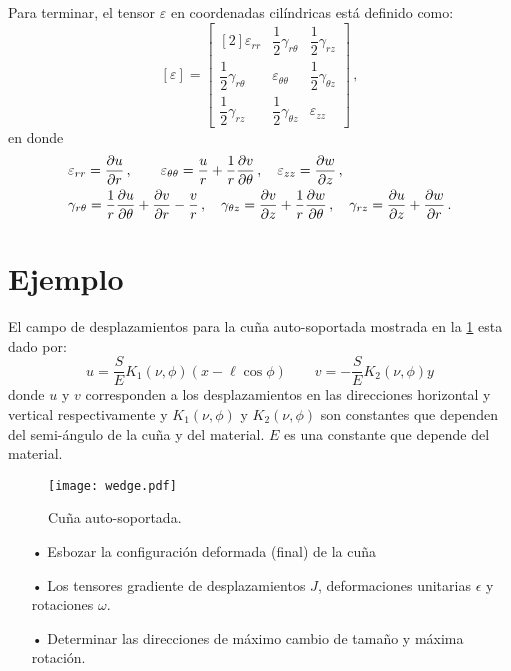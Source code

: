 \documentclass[../notas medios.tex]{subfiles}
\begin{document}
Para terminar, el tensor $\varepsilon$ en coordenadas cilíndricas está definido 
como: 
\[	
[\varepsilon] =
\begin{bmatrix}[2]
  \varepsilon_{rr} & \dfrac{1}{2} \gamma_{r\theta} & \dfrac{1}{2} \gamma_{rz}  
  \\
  \dfrac{1}{2} \gamma_{r\theta}  & \varepsilon_{\theta\theta} & 
  \dfrac{1}{2}  \gamma_{\theta z}  \\
  \dfrac{1}{2} \gamma_{rz} & \dfrac{1}{2} \gamma_{\theta z}  &  
  \varepsilon_{zz}
\end{bmatrix}\, ,\]
en donde
\begin{align*}	
    &\varepsilon_{rr} = \pdv{u}{r}\, ,\qquad
    \varepsilon_{\theta \theta} = \frac{u}{r} + \frac{1}{r}\pdv{v}{\theta}\, ,
    \quad \varepsilon_{zz} = \pdv{w}{z}\, ,\\
    &\gamma_{r \theta} = \frac{1}{r} \pdv{u}{\theta} + \pdv{v}{r} - 
    \frac{v}{r}\, ,\quad
    \gamma_{\theta z} = \pdv{v}{z} + \frac{1}{r}\pdv{w}{\theta}\, ,\quad
    \gamma_{rz}	 = \pdv{u}{z} + \pdv{w}{r}\, .
\end{align*}

\section*{Ejemplo}

El campo de desplazamientos para la cuña auto-soportada mostrada en la \cref{wedge} esta dado por:
\begin{equation*}	
	u = \frac{S}{E} K_1 (\nu ,\phi) (x - \ell \cos\phi)\qquad
	v =  - \frac{S}{E} K_2 (\nu ,\phi) y
\end{equation*}
donde $u$ y $v$ corresponden a los desplazamientos en las direcciones horizontal y vertical respectivamente y ${K_1}\left( {\nu ,\phi } \right)$ y ${K_2}\left( {\nu ,\phi } \right)$ son constantes que dependen del semi-ángulo de la cuña y del material. $E$ es una constante que depende del material. 
\begin{figure}[H]
\centering
	\texttt{[image: wedge.pdf]}
	\caption{Cuña auto-soportada.}
	\label{wedge}
\end{figure}

\begin{itemize}
\item[•] Esbozar la configuración deformada (final) de la cuña
\item[•] Los tensores gradiente de desplazamientos $J$, deformaciones unitarias $\epsilon$ y rotaciones $\omega$.
\item[•] Determinar las direcciones de máximo cambio de tamaño y máxima rotación.
\end{itemize}
\end{document}
